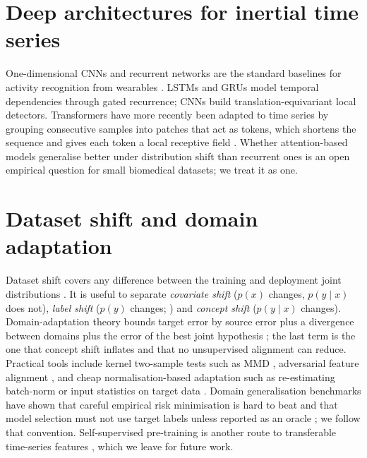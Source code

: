 \section{Deep architectures for inertial time series}

One-dimensional CNNs and recurrent networks are the standard baselines for activity recognition
from wearables \parencite{ordonez2016deepconvlstm,wang2019survey,fawaz2019tsc}. LSTMs \parencite{hochreiter1997lstm} and
GRUs \parencite{cho2014gru} model temporal dependencies through gated recurrence; CNNs build
translation-equivariant local detectors. Transformers \parencite{vaswani2017attention} have more recently been
adapted to time series by grouping consecutive samples into patches that act as tokens, which
shortens the sequence and gives each token a local receptive field \parencite{nie2023patchtst,zerveas2021tst}. Whether
attention-based models generalise better under distribution shift than recurrent ones is an open
empirical question for small biomedical datasets; we treat it as one.

\section{Dataset shift and domain adaptation}

Dataset shift covers any difference between the training and deployment joint distributions
\parencite{quionero2009shift,morenotorres2012shift}. It is useful to separate \emph{covariate shift} ($p(x)$ changes,
$p(y\mid x)$ does not), \emph{label shift} ($p(y)$ changes; \cite{lipton2018labelshift}) and \emph{concept shift}
($p(y\mid x)$ changes). Domain-adaptation theory bounds target error by source error plus a
divergence between domains plus the error of the best joint hypothesis \parencite{bendavid2010theory}; the
last term is the one that concept shift inflates and that no unsupervised alignment can reduce.
Practical tools include kernel two-sample tests such as MMD \parencite{gretton2012mmd}, adversarial
feature alignment \parencite{ganin2016dann,wilson2020codats}, and cheap normalisation-based adaptation such as
re-estimating batch-norm or input statistics on target data \parencite{li2017adabn,kim2022revin}. Domain
generalisation benchmarks have shown that careful empirical risk minimisation is hard to beat and
that model selection must not use target labels unless reported as an oracle
\parencite{gulrajani2021domainbed}; we follow that convention. Self-supervised pre-training is another route
to transferable time-series features \parencite{eldele2021tstcc}, which we leave for future work.

